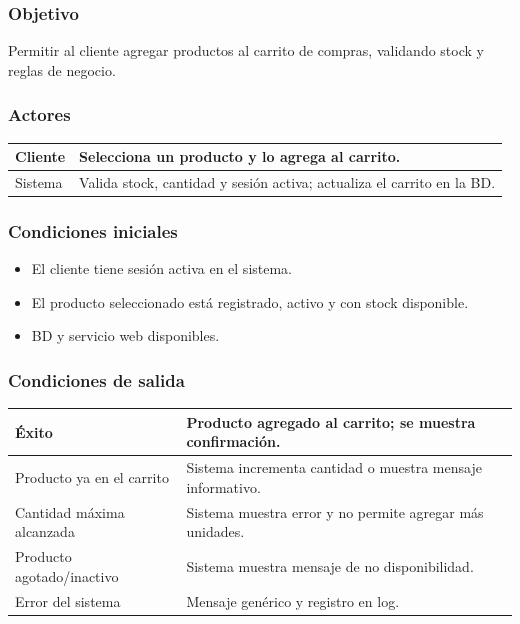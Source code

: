 \documentclass[12pt,a4paper]{article}
\begin{document}
\subsubsection*{Objetivo}
Permitir al cliente agregar productos al carrito de compras, validando stock y reglas de negocio.

\subsubsection*{Actores}
\begin{longtable}{|l|p{10cm}|}
    \hline
    Cliente & Selecciona un producto y lo agrega al carrito.                         \\ \hline
    Sistema & Valida stock, cantidad y sesión activa; actualiza el carrito en la BD. \\ \hline
\end{longtable}

\subsubsection*{Condiciones iniciales}
\begin{itemize}[label=--]
    \item El cliente tiene sesión activa en el sistema.
    \item El producto seleccionado está registrado, activo y con stock disponible.
    \item BD y servicio web disponibles.
\end{itemize}

\subsubsection*{Condiciones de salida}
\begin{longtable}{|l|p{10cm}|}
    \hline
    Éxito                     & Producto agregado al carrito; se muestra confirmación.     \\ \hline
    Producto ya en el carrito & Sistema incrementa cantidad o muestra mensaje informativo. \\ \hline
    Cantidad máxima alcanzada & Sistema muestra error y no permite agregar más unidades.   \\ \hline
    Producto agotado/inactivo & Sistema muestra mensaje de no disponibilidad.              \\ \hline
    Error del sistema         & Mensaje genérico y registro en log.                        \\ \hline
\end{longtable}
\end{document}
